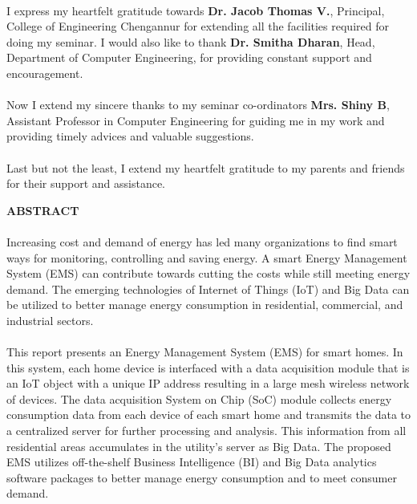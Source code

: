 \documentclass[a4paper,12pt,oneside]{article}
\begin{document}
\paragraph{}
I express my heartfelt gratitude towards \textbf{Dr. Jacob Thomas V.}, Principal, College
of Engineering Chengannur for extending all the facilities required for doing my seminar.
I would also like to thank \textbf{Dr. Smitha Dharan}, Head, Department of Computer
Engineering, for providing constant support and encouragement.
\paragraph{}
Now I extend my sincere thanks to my seminar co-ordinators \textbf{Mrs. Shiny B}, Assistant
Professor in Computer Engineering for guiding me in my work and providing timely
advices and valuable suggestions.
\paragraph{}
Last but not the least, I extend my heartfelt gratitude to my parents and friends for
their support and assistance.	

\newpage
\begin{center}
\large{\textbf{ABSTRACT}}
\end{center}
\vspace{4ex}
\paragraph{}
Increasing cost and demand of energy has led many
organizations to find smart ways for monitoring, controlling and
saving energy. A smart Energy Management System (EMS) can
contribute towards cutting the costs while still meeting energy
demand. The emerging technologies of Internet of Things (IoT)
and Big Data can be utilized to better manage energy
consumption in residential, commercial, and industrial sectors.
\paragraph{}
This report presents an Energy Management System (EMS) for
smart homes. In this system, each home device is interfaced with
a data acquisition module that is an IoT object with a unique IP
address resulting in a large mesh wireless network of devices.
The data acquisition System on Chip (SoC) module collects
energy consumption data from each device of each smart home
and transmits the data to a centralized server for further
processing and analysis. This information from all residential
areas accumulates in the utility’s server as Big Data. The
proposed EMS utilizes off-the-shelf Business Intelligence (BI) and
Big Data analytics software packages to better manage energy
consumption and to meet consumer demand.
\setlength{\baselineskip}{1.0\baselineskip}
\end{document}
